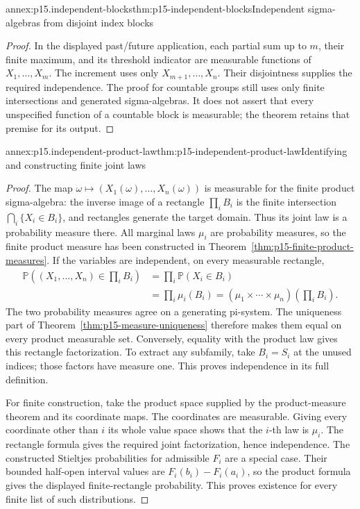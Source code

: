 \begin{annexitem}{annex:p15.independent-blocks}{thm:p15-independent-blocks}{Independent sigma-algebras from disjoint index blocks}
\begin{proof}
In the displayed past/future application, each partial sum up to
\(m\), their finite maximum, and its threshold indicator are
measurable functions of \(X_1,\ldots,X_m\). The increment uses
only \(X_{m+1},\ldots,X_n\). Their disjointness supplies the
required independence. The proof for countable groups still uses
only finite intersections and generated sigma-algebras. It does
not assert that every unspecified function of a countable block
is measurable; the theorem retains that premise for its output.
\end{proof}
\end{annexitem}

\begin{annexitem}{annex:p15.independent-product-law}{thm:p15-independent-product-law}{Identifying and constructing finite joint laws}
\begin{proof}
The map \(\omega\mapsto(X_1(\omega),\ldots,X_n(\omega))\)
is measurable for the finite product sigma-algebra: the inverse
image of a rectangle \(\prod_i B_i\) is the finite intersection
\(\bigcap_i\{X_i\in B_i\}\), and rectangles generate the
target domain. Thus its joint law is a probability measure there.
All marginal laws \(\mu_i\) are probability measures, so the
finite product measure has been constructed in
Theorem~\ref{thm:p15-finite-product-measures}.
If the variables are independent, on every measurable rectangle,
\[
 \begin{aligned}
 \mathbb P((X_1,\ldots,X_n)\in\textstyle\prod_iB_i)
   &=\prod_i\mathbb P(X_i\in B_i)\\
   &=\prod_i\mu_i(B_i)
     =(\mu_1\times\cdots\times\mu_n)(\textstyle\prod_iB_i).
 \end{aligned}
\]
The two probability measures agree on a generating pi-system.
The uniqueness part of Theorem~\ref{thm:p15-measure-uniqueness}
therefore makes them equal on every product measurable set.
Conversely, equality with the product law gives this rectangle
factorization. To extract any subfamily, take \(B_i=S_i\)
at the unused indices; those factors have measure one. This proves
independence in its full definition.

For finite construction, take the product space supplied by the
product-measure theorem and its coordinate maps. The coordinates
are measurable. Giving every coordinate other than \(i\) its
whole value space shows that the \(i\)-th law is \(\mu_i\).
The rectangle formula gives the required joint factorization, hence
independence. The constructed Stieltjes probabilities for admissible
\(F_i\) are a special case. Their bounded half-open interval
values are \(F_i(b_i)-F_i(a_i)\), so the product formula gives
the displayed finite-rectangle probability. This proves existence
for every finite list of such distributions.


\end{proof}
\end{annexitem}
